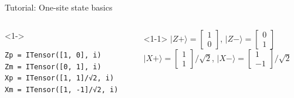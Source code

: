 \begin{frame}[fragile]{Tutorial: One-site state basics}

\begin{columns}

\begin{column}[T]{0.45\textwidth}
\begin{onlyenv}<1->
\begin{lstlisting}[language=JuliaLocal, style=julia, basicstyle=\small]
Zp = ITensor([1, 0], i)
Zm = ITensor([0, 1], i)
Xp = ITensor([1, 1]/√2, i) 
Xm = ITensor([1, -1]/√2, i) 
\end{lstlisting}
\end{onlyenv}
\end{column}

\begin{column}[T]{0.6\textwidth}
\begin{onlyenv}<1-1>
$|Z+\rangle = \begin{bmatrix} 1 \\ 0 \end{bmatrix}$,
  $|Z-\rangle = \begin{bmatrix} 0 \\ 1 \end{bmatrix}$ \\
$|X+\rangle = \begin{bmatrix} 1 \\ 1 \end{bmatrix}/\sqrt{2}$,
  $|X-\rangle = \begin{bmatrix} 1 \\ -1 \end{bmatrix}/\sqrt{2}$
\end{onlyenv}


\end{column}
\end{columns}
\end{frame}
